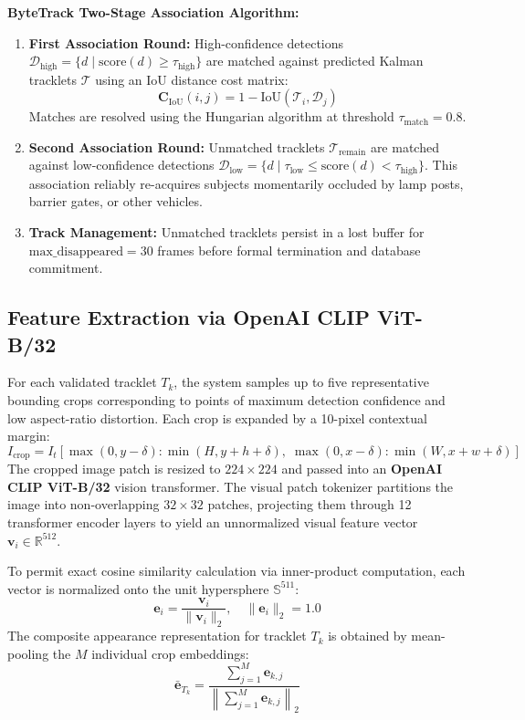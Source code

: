 \documentclass[12pt,a4paper]{article}
\begin{document}
\noindent\textbf{ByteTrack Two-Stage Association Algorithm:}
\begin{enumerate}
    \item \textbf{First Association Round:} High-confidence detections $\mathcal{D}_{\text{high}} = \{d \mid \text{score}(d) \ge \tau_{\text{high}}\}$ are matched against predicted Kalman tracklets $\mathcal{T}$ using an IoU distance cost matrix:
    \begin{equation}
    \mathbf{C}_{\text{IoU}}(i, j) = 1 - \text{IoU}(\mathcal{T}_i, \mathcal{D}_j)
    \end{equation}
    Matches are resolved using the Hungarian algorithm at threshold $\tau_{\text{match}} = 0.8$.
    \item \textbf{Second Association Round:} Unmatched tracklets $\mathcal{T}_{\text{remain}}$ are matched against low-confidence detections $\mathcal{D}_{\text{low}} = \{d \mid \tau_{\text{low}} \le \text{score}(d) < \tau_{\text{high}}\}$. This association reliably re-acquires subjects momentarily occluded by lamp posts, barrier gates, or other vehicles.
    \item \textbf{Track Management:} Unmatched tracklets persist in a lost buffer for $\text{max\_disappeared} = 30$ frames before formal termination and database commitment.
\end{enumerate}

\subsection{Feature Extraction via OpenAI CLIP ViT-B/32}
For each validated tracklet $T_k$, the system samples up to five representative bounding crops corresponding to points of maximum detection confidence and low aspect-ratio distortion. Each crop is expanded by a 10-pixel contextual margin:
\begin{equation}
I_{\text{crop}} = I_t\left[\max(0, y-\delta) : \min(H, y+h+\delta), \; \max(0, x-\delta) : \min(W, x+w+\delta)\right]
\end{equation}
The cropped image patch is resized to $224 \times 224$ and passed into an \textbf{OpenAI CLIP ViT-B/32} vision transformer. The visual patch tokenizer partitions the image into non-overlapping $32 \times 32$ patches, projecting them through 12 transformer encoder layers to yield an unnormalized visual feature vector $\mathbf{v}_i \in \mathbb{R}^{512}$.

To permit exact cosine similarity calculation via inner-product computation, each vector is normalized onto the unit hypersphere $\mathbb{S}^{511}$:
\begin{equation}
\mathbf{e}_i = \frac{\mathbf{v}_i}{\|\mathbf{v}_i\|_2}, \quad \|\mathbf{e}_i\|_2 = 1.0
\end{equation}
The composite appearance representation for tracklet $T_k$ is obtained by mean-pooling the $M$ individual crop embeddings:
\begin{equation}
\bar{\mathbf{e}}_{T_k} = \frac{\sum_{j=1}^M \mathbf{e}_{k, j}}{\left\|\sum_{j=1}^M \mathbf{e}_{k, j}\right\|_2}
\end{equation}
\end{document}
